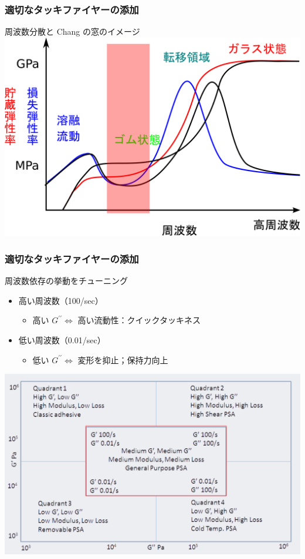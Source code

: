 \documentclass[12pt, dvipdfmx]{beamer}
\begin{document}
\begin{frame}
	\frametitle{適切なタッキファイヤーの添加}
		\large{\alert{周波数分散と Chang の窓のイメージ}}
		\vspace{5mm}
			\centering
				\includegraphics[width=.8\textwidth]{dynamic_ViscoElast_Freq_rubber.png}
\end{frame}


\begin{frame}
	\frametitle{適切なタッキファイヤーの添加}
		\begin{alertblock}{周波数依存の挙動をチューニング}
			\begin{itemize}
				\item 高い周波数（100/sec）
				\begin{itemize}
					\item 高い $G^{\prime \prime} \Leftrightarrow$ 高い流動性：クイックタッキネス
				\end{itemize}
				\item 低い周波数（0.01/sec）
				\begin{itemize}
					\item 低い $G^{\prime \prime} \Leftrightarrow$ 変形を抑止；保持力向上
				\end{itemize}
			\end{itemize}

			\vspace{3mm}
			\centering
				\includegraphics[width=.5\textwidth]{ChangFrequencies_2.png}
		\end{alertblock}	
\end{frame}
\end{document}
